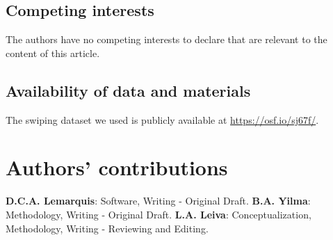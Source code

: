 \documentclass[sn-mathphys, pdflatex]{sn-jnl}
\begin{document}
\subsection*{Competing interests}
The authors have no competing interests to declare that are relevant to the content of this article.

\subsection*{Availability of data and materials}
The swiping dataset we used is publicly available at \url{https://osf.io/sj67f/}.

\section*{Authors' contributions}
\textbf{D.C.A. Lemarquis}: Software, Writing - Original Draft.
\textbf{B.A. Yilma}: Methodology, Writing - Original Draft.
\textbf{L.A. Leiva}: Conceptualization, Methodology, Writing - Reviewing and Editing.


%

\end{document}
